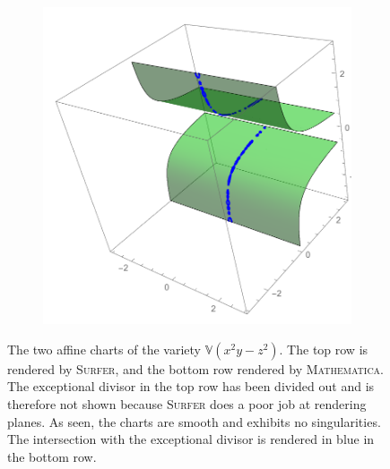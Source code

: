 \documentclass{article}
\newcommand{\V}{\ensuremath{\mathbb{V}}}
\begin{document}
\begin{example}
\begin{figure}[h!]
\begin{subfigure}[t]{0.3\textwidth}
            \end{subfigure}
            ~
            \begin{subfigure}[t]{0.3\textwidth}
                \includegraphics[width=\textwidth]{pictures/affine_2_exceptional.pdf} 
            \end{subfigure}
            \caption{The two affine charts of the variety $\V(x^2y-z^2)$. The top
                row is rendered by \textsc{Surfer}, and the bottom row rendered by
                \textsc{Mathematica.} The exceptional divisor in the top row has
                been divided out and is therefore not shown because \textsc{Surfer}
                does a poor job at rendering planes. As seen, the charts are smooth and
                exhibits no singularities. The intersection with the exceptional divisor is
            rendered in blue in the bottom row.}
            \label{fig:affine_line}
        \end{figure}
    \end{example}
\end{document}
